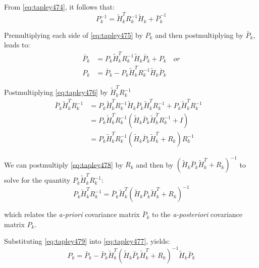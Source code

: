 From \ref{eq:tapley474}, it follows that:
\begin{equation}
	\label{eq:tapley475}
	P^{-1}_k
	= \tilde{H}^T_k R^{-1}_k \tilde{H}_k + \bar{P}^{-1}_k
\end{equation}

Premultiplying each side of \ref{eq:tapley475} by \(P_k\) and then postmultiplying
by \(\bar{P}_k\), leads to:
\begin{subequations}
	\begin{align}
		\bar{P}_k & =
		P_k \tilde{H}^T_k R^{-1}_k \tilde{H}_k \bar{P}_k + P_k
		\quad or \label{eq:tapley476} \\
		P_k       & =
		\bar{P}_k - P_k \tilde{H}^T_k R^{-1}_k \tilde{H}_k \bar{P}_k
		\label{eq:tapley477}
	\end{align}
\end{subequations}

Postmultiplying \ref{eq:tapley476} by \(\tilde{H}^T_k R^{-1}_k\)
\begin{equation}
	\label{eq:tapley478}
	\begin{aligned}
		\bar{P}_k \tilde{H}^T_k R^{-1}_k                           & =
		P_k \tilde{H}^T_k R^{-1}_k \tilde{H}_k \bar{P}_k \tilde{H}^T_k R^{-1}_k +
		P_k \tilde{H}^T_k R^{-1}_k                                 &                                     \\
		                                                           & = P_k \tilde{H}^T_k R^{-1}_k \left(
		\tilde{H}_k \bar{P}_k \tilde{H}^T_k R^{-1}_k + I \right)   &                                     \\
		                                                           & = P_k \tilde{H}^T_k R^{-1}_k \left(
		\tilde{H}_k \bar{P}_k \tilde{H}^T_k + R_k \right) R^{-1}_k &
	\end{aligned}
\end{equation}

We can postmultiply \ref{eq:tapley478} by \(R_k\) and then by
\(\left(\tilde{H}_k \bar{P}_k \tilde{H}^T_k + R_k \right) ^{-1} \) to solve for
the quantity \(P_k \tilde{H}^T_k R^{-1}_k\):
\begin{equation}
	\label{eq:tapley479}
	P_k \tilde{H}^T_k R^{-1}_k =
	\bar{P}_k \tilde{H}^T_k \left( \tilde{H}_k \bar{P}_k \tilde{H}^T_k + R_k \right) ^{-1}
\end{equation}

which relates the \emph{a-priori} covariance matrix \(\bar{P}_k\) to the
\emph{a-posteriori} covariance matrix \(P_k\).

Substituting \ref{eq:tapley479} into \ref{eq:tapley477}, yields:
\begin{equation}
	\label{eq:tapley4710}
	P_k =
	\bar{P}_k - \bar{P}_k \tilde{H}^T_k \left( \tilde{H}_k \bar{P}_k \tilde{H}^T_k + R_k \right) ^{-1} \tilde{H}_k \bar{P}_k
\end{equation}

